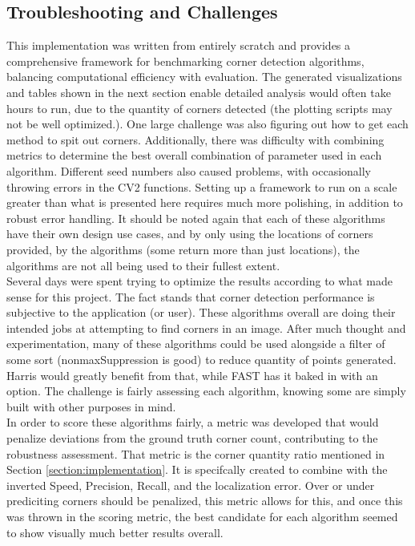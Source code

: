 \documentclass[journal]{IEEEtran}
\begin{document}
\subsection{Troubleshooting and Challenges}
This implementation was written from entirely scratch and provides a comprehensive framework for benchmarking corner detection algorithms, balancing computational efficiency with evaluation. The generated visualizations and tables shown in the next section enable detailed analysis would often take hours to run, due to the quantity of corners detected (the plotting scripts may not be well optimized.). One large challenge was also figuring out how to get each method to spit out corners. Additionally, there was difficulty with combining metrics to determine the best overall combination of parameter used in each algorithm. Different seed numbers also caused problems, with occasionally throwing errors in the CV2 functions. Setting up a framework to run on a scale greater than what is presented here requires much more polishing, in addition to robust error handling. It should be noted again that each of these algorithms have their own design use cases, and by only using the locations of corners provided, by the algorithms (some return more than just locations), the algorithms are not all being used to their fullest extent.\\

Several days were spent trying to optimize the results according to what made sense for this project. The fact stands that corner detection performance is subjective to the application (or user). These algorithms overall are doing their intended jobs at attempting to find corners in an image. After much thought and experimentation, many of these algorithms could be used alongside a filter of some sort (nonmaxSuppression is good) to reduce quantity of points generated. Harris would greatly benefit from that, while FAST has it baked in with an option. The challenge is fairly assessing each algorithm, knowing some are simply built with other purposes in mind.\\

In order to score these algorithms fairly, a metric was developed that would penalize deviations from the ground truth corner count, contributing to the robustness assessment. That metric is the corner quantity ratio mentioned in Section \ref{section:implementation}. It is specifcally created to combine with the inverted Speed, Precision, Recall, and the localization error. Over or under prediciting corners should be penalized, this metric allows for this, and once this was thrown in the scoring metric, the best candidate for each algorithm seemed to show visually much better results overall.
\end{document}
